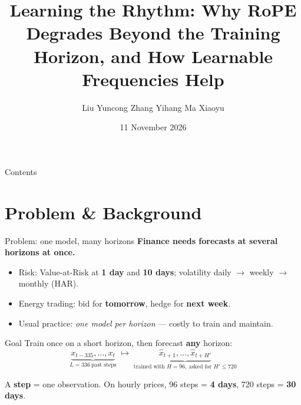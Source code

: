 \documentclass[aspectratio=169,xcolor=dvipsnames]{beamer}
\title[Learning the Rhythm: RoPE beyond the training horizon]{Learning the Rhythm: Why RoPE Degrades Beyond the Training Horizon, and How Learnable Frequencies Help}
\author[Liu, Zhang, Ma]{Liu Yuncong \quad Zhang Yihang \quad Ma Xiaoyu}
\institute[NUS]{FT5011 Deep Learning for Finance \\ National University of Singapore}
\date{11 November 2026}
\begin{document}
\begin{frame}[plain]
  \titlepage
\end{frame}

\begin{frame}[plain]{Contents}
  \tableofcontents
\end{frame}

\section{Problem \& Background}

\begin{frame}{Problem: one model, many horizons}
\textbf{Finance needs forecasts at several horizons at once.}
\begin{itemize}
\item Risk: Value-at-Risk at \textbf{1 day} and \textbf{10 days}; volatility daily $\to$ weekly $\to$ monthly (HAR).
\item Energy trading: bid for \textbf{tomorrow}, hedge for \textbf{next week}.
\item Usual practice: \emph{one model per horizon} --- costly to train and maintain.
\end{itemize}
\begin{block}{Goal}
Train once on a short horizon, then forecast \textbf{any} horizon:
\[
\underbrace{x_{t-335},\dots,x_t}_{L=336\ \text{past steps}}
\;\longmapsto\;
\underbrace{\hat x_{t+1},\dots,\hat x_{t+H'}}_{\text{trained with } H=96,\ \text{asked for } H'\le 720}
\]
\end{block}
\small A \textbf{step} = one observation. On hourly prices, 96 steps = \textbf{4 days}, 720 steps = \textbf{30 days}.
\end{frame}
\end{document}
